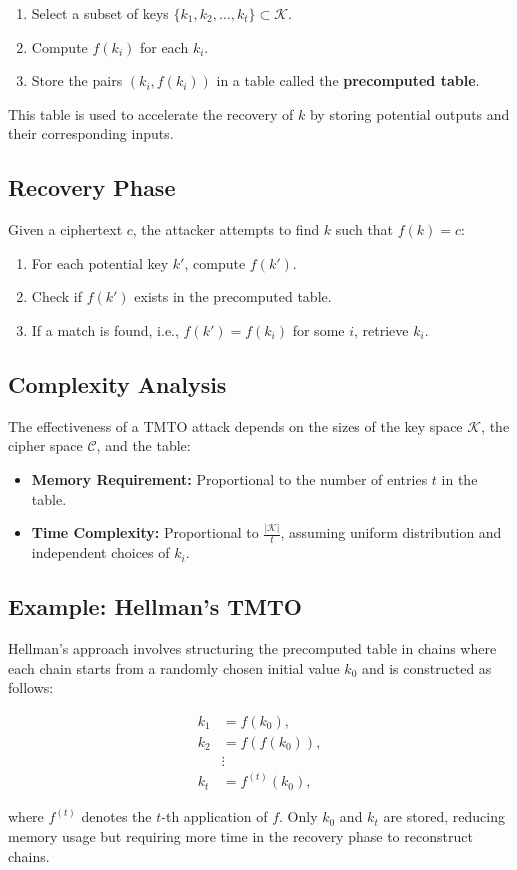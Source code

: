 \begin{enumerate}
	\item Select a subset of keys $\{k_1, k_2, \dots, k_t\} \subset \mathcal{K}$.
	\item Compute $f(k_i)$ for each $k_i$.
	\item Store the pairs $(k_i, f(k_i))$ in a table called the \textbf{precomputed table}.
\end{enumerate}

This table is used to accelerate the recovery of $k$ by storing potential outputs and their corresponding inputs.

\subsection*{Recovery Phase}
Given a ciphertext $c$, the attacker attempts to find $k$ such that $f(k) = c$:

\begin{enumerate}
	\item For each potential key $k'$, compute $f(k')$.
	\item Check if $f(k')$ exists in the precomputed table.
	\item If a match is found, i.e., $f(k') = f(k_i)$ for some $i$, retrieve $k_i$.
\end{enumerate}

\subsection*{Complexity Analysis}
The effectiveness of a TMTO attack depends on the sizes of the key space $\mathcal{K}$, the cipher space $\mathcal{C}$, and the table:

\begin{itemize}
	\item \textbf{Memory Requirement:} Proportional to the number of entries $t$ in the table.
	\item \textbf{Time Complexity:} Proportional to $\frac{|\mathcal{K}|}{t}$, assuming uniform distribution and independent choices of $k_i$.
\end{itemize}

\subsection*{Example: Hellman's TMTO}
Hellman's approach involves structuring the precomputed table in chains where each chain starts from a randomly chosen initial value $k_0$ and is constructed as follows:

\begin{align*}
	k_1 &= f(k_0), \\
	k_2 &= f(f(k_0)), \\
	&\vdots \\
	k_t &= f^{(t)}(k_0),
\end{align*}

where $f^{(t)}$ denotes the $t$-th application of $f$. Only $k_0$ and $k_t$ are stored, reducing memory usage but requiring more time in the recovery phase to reconstruct chains.

